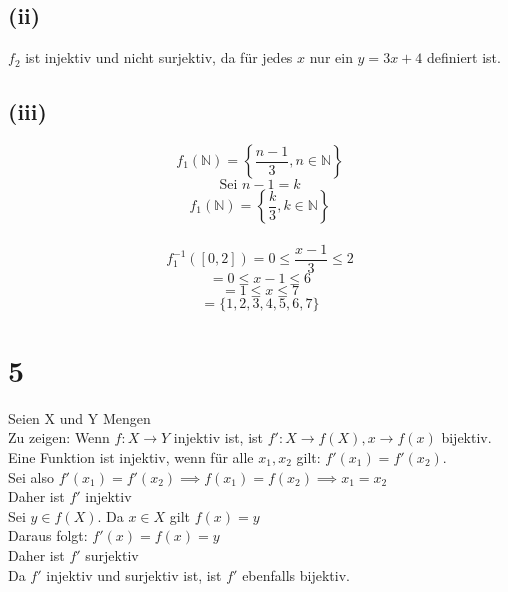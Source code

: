 \documentclass{article}
\begin{document}
\subsection{(ii)}
$f_2$ ist injektiv und nicht surjektiv, da für jedes $x$ nur ein $y = 3x + 4$ definiert ist.
\subsection{(iii)}
\[f_1(\mathbb{N}) = \left\{ \frac{n-1}{3}, n \in \mathbb{N} \right\}\]
\[\text{Sei } n-1 = k\]
\[f_1(\mathbb{N}) = \left\{\frac{k}{3}, k \in \mathbb{N}\right\}\]
\\ \newline
\[f_1^{-1}([0,2]) = 0 \leq \frac{x-1}{3} \leq 2\]
\[= 0 \leq x - 1 \leq 6\]
\[= 1 \leq x \leq 7\]
\[= \{1, 2, 3, 4, 5, 6, 7\}\]
\section{5}
Seien X und Y Mengen \\
Zu zeigen: Wenn $f:X \rightarrow Y$ injektiv ist, ist $f':X \rightarrow f(X), x\rightarrow f(x)$ bijektiv. \\ 
Eine Funktion ist injektiv, wenn für alle $x_1, x_2$ gilt: $f'(x_1)=f'(x_2)$. \\
Sei also $f'(x_1) = f'(x_2) \implies f(x_1) = f(x_2) \implies x_1 = x_2$  \\
Daher ist $f'$ injektiv \\
Sei $y \in f(X)$. Da $x \in X$ gilt $f(x)=y$ \\
Daraus folgt: $f'(x) = f(x) = y$ \\
Daher ist $f'$ surjektiv \\
Da $f'$ injektiv und surjektiv ist, ist $f'$ ebenfalls bijektiv. \\
\end{document}
